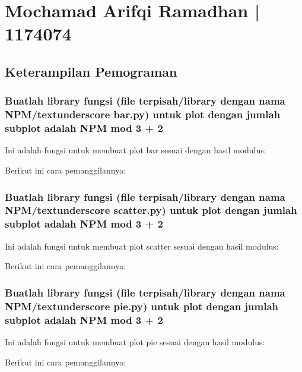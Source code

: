 \section{Mochamad Arifqi Ramadhan | 1174074}
\subsection{Keterampilan Pemograman }
\subsubsection{Buatlah library fungsi (file terpisah/library dengan nama NPM/textunderscore bar.py) untuk plot dengan jumlah subplot adalah NPM mod 3 + 2}

Ini adalah fungsi untuk membuat plot bar sesuai dengan hasil modulus:


Berikut ini cara pemanggilannya:


\subsubsection{Buatlah library fungsi (file terpisah/library dengan nama NPM/textunderscore scatter.py) untuk plot dengan jumlah subplot adalah NPM mod 3 + 2}

Ini adalah fungsi untuk membuat plot scatter sesuai dengan hasil modulus:


Berikut ini cara pemanggilannya:


\subsubsection{Buatlah library fungsi (file terpisah/library dengan nama NPM/textunderscore pie.py) untuk plot dengan jumlah subplot adalah NPM mod 3 + 2}

Ini adalah fungsi untuk membuat plot pie sesuai dengan hasil modulus:


Berikut ini cara pemanggilannya:



